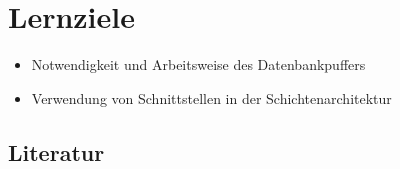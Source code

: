 \section*{Lernziele}
\begin{itemize}
	\item Notwendigkeit und Arbeitsweise des Datenbankpuffers
	\item Verwendung von Schnittstellen in der Schichtenarchitektur
\end{itemize}

\begin{normalText}
\section*{Literatur}


\end{normalText}
